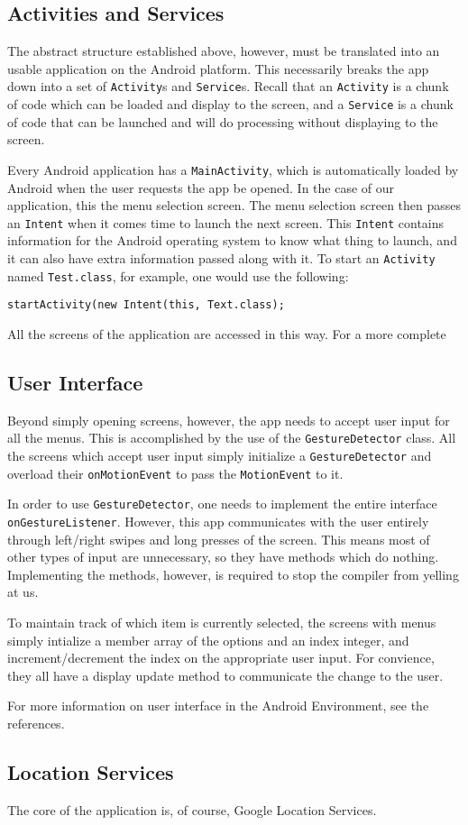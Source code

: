 \subsection{Activities and Services}

The abstract structure established above, however, must be translated into an usable application on the Android platform. This necessarily 
breaks the app down into a set of \verb|Activity|s and \verb|Service|s. Recall that an \verb|Activity| is a chunk of code which can be loaded
and display to the screen, and a \verb|Service| is a chunk of code that can be launched and will do processing without displaying to the 
screen.

Every Android application has a \verb|MainActivity|, which is automatically loaded by Android when the user requests the app be opened. 
In the case of our application, this the menu selection screen. The menu selection screen then passes an \verb|Intent| when it comes time to launch the next screen.
This \verb|Intent| contains information for the Android operating system to know what thing to launch, and it can also have extra information passed along with it.
To start an \verb|Activity| named \verb|Test.class|, for example, one would use the following:
\begin{verbatim}
startActivity(new Intent(this, Text.class);
\end{verbatim}
All the screens of the application are accessed in this way. For a more complete

\subsection{User Interface}
Beyond simply opening screens, however, the app needs to accept user input for all the menus. This is accomplished by the use of the \verb|GestureDetector| class.
All the screens which accept user input simply initialize a \verb|GestureDetector| and overload their \verb|onMotionEvent| to pass the \verb|MotionEvent| to it.

In order to use \verb|GestureDetector|, one needs to implement the entire interface \verb|onGestureListener|. However, this app communicates with the user entirely through
left/right swipes and long presses of the screen. This means most of other types of input are unnecessary, so they have methods which do nothing. Implementing the methods, 
however, is required to stop the compiler from yelling at us. 

To maintain track of which item is currently selected, the screens with menus simply intialize a member array of the options and an index integer, and increment/decrement the
index on the appropriate user input. For convience, they all have a display update method to communicate the change to the user.

For more information on user interface in the Android Environment, see the references.\cite{gestureDetector}

\subsection{Location Services}
The core of the application is, of course, Google Location Services.
